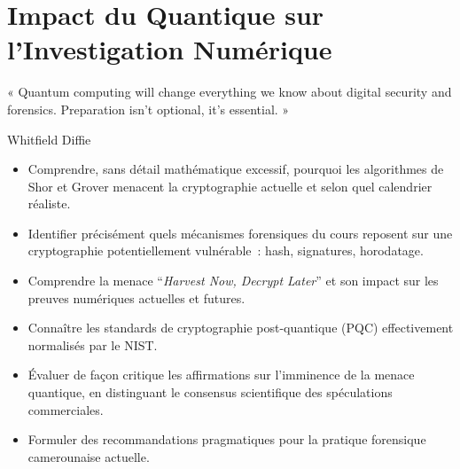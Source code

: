
\chapter{Impact du Quantique sur l'Investigation Numérique}
\label{chap:quantique}

\epigraph{%
    « Quantum computing will change everything we know about digital
    security and forensics. Preparation isn't optional, it's
    essential. »%
}{Whitfield Diffie}


\begin{boxobjectifs}
\begin{itemize}
    \item Comprendre, sans détail mathématique excessif, pourquoi
          les algorithmes de Shor et Grover menacent la cryptographie
          actuelle et selon quel calendrier réaliste.
    \item Identifier précisément quels mécanismes forensiques du
          cours reposent sur une cryptographie potentiellement
          vulnérable~: hash, signatures, horodatage.
    \item Comprendre la menace ``\textit{Harvest Now, Decrypt Later}''
          et son impact sur les preuves numériques actuelles et futures.
    \item Connaître les standards de cryptographie post-quantique
          (PQC) effectivement normalisés par le NIST.
    \item Évaluer de façon critique les affirmations sur l'imminence
          de la menace quantique, en distinguant le consensus
          scientifique des spéculations commerciales.
    \item Formuler des recommandations pragmatiques pour la
          pratique forensique camerounaise actuelle.
\end{itemize}
\end{boxobjectifs}

